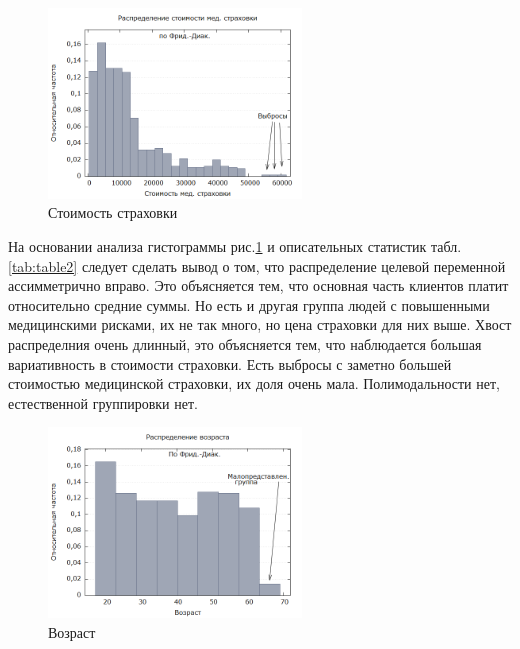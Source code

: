 \documentclass[a4paper,12pt]{article}
\begin{document}
\begin{figure}[H]
	\includegraphics[width=0.6\textwidth]{../[graphics]/charges.png}
	\centering
	\caption{Стоимость страховки}
	\label{fig:charges}
\end{figure}

На основании анализа гистограммы рис.\ref{fig:charges} и описательных статистик табл.\ref{tab:table2} следует сделать вывод о том, что распределение целевой переменной ассимметрично вправо. Это объясняется тем, что основная часть клиентов платит относительно средние суммы. Но есть и другая группа людей с повышенными медицинскими рисками, их не так много, но цена страховки для них выше. Хвост распределния очень длинный, это объясняется тем, что наблюдается большая вариативность в стоимости страховки. Есть выбросы с заметно большей стоимостью медицинской страховки, их доля очень мала. Полимодальности нет, естественной группировки нет.

\begin{figure}[H]
	\includegraphics[width=0.6\textwidth]{../[graphics]/age.png}
	\centering
	\caption{Возраст}
	\label{fig:age}
\end{figure}
\end{document}
